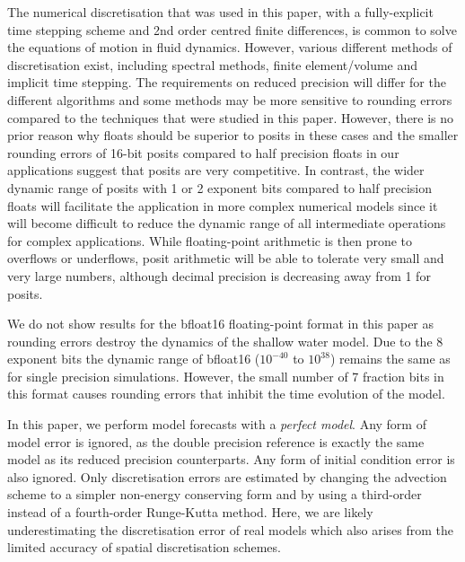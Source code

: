 \documentclass[draft]{agujournal2019}
\begin{document}
The numerical discretisation that was used in this paper, with a fully-explicit time stepping scheme and 2nd order centred finite differences, is common to solve the equations of motion in fluid dynamics. However, various different methods of discretisation exist, including spectral methods, finite element/volume and implicit time stepping. The requirements on reduced precision will differ for the different algorithms and some methods may be more sensitive to rounding errors compared to the techniques that were studied in this paper. However, there is no prior reason why floats should be superior to posits in these cases and the smaller rounding errors of 16-bit posits compared to half precision floats in our applications suggest that posits are very competitive. 
In contrast, the wider dynamic range of posits with 1 or 2 exponent bits compared to half precision floats will facilitate the application in more complex numerical models since it will become difficult to reduce the dynamic range of all intermediate operations for complex applications. While floating-point arithmetic is then prone to overflows or underflows, posit arithmetic will be able to tolerate very small and very large numbers, although decimal precision is decreasing away from 1 for posits.

We do not show results for the bfloat16 floating-point format in this paper as rounding errors destroy the dynamics of the shallow water model. Due to the 8 exponent bits the dynamic range of bfloat16 ($10^{-40}$ to $10^{38}$) remains the same as for single precision simulations. However, the small number of 7 fraction bits in this format causes rounding errors that inhibit the time evolution of the model.

In this paper, we perform model forecasts with a \emph{perfect model}. Any form of model error is ignored, as the double precision reference is exactly the same model as its reduced precision counterparts. Any form of initial condition error is also ignored. Only discretisation errors are estimated by changing the advection scheme to a simpler non-energy conserving form \cite{Sadourny1975} and by using a third-order instead of a fourth-order Runge-Kutta method. Here, we are likely underestimating the discretisation error of real models which also arises from the limited accuracy of spatial discretisation schemes. 
\end{document}
